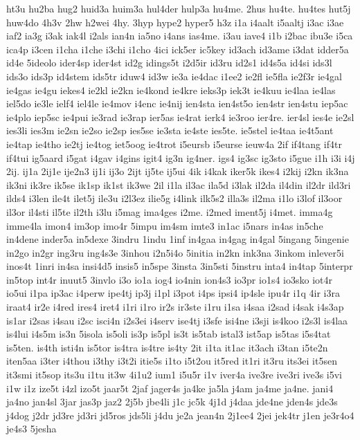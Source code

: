 {ht3u
hu2ba
hug2
huid3a
huim3a
hul4der
hulp3a
hu4me.
2hus
hu4te.
hu4tes
hut5j
huw4do
4h3v
2hw
h2wei
4hy.
3hyp
hype2
hyper5
h3z
i1a
i4aalt
i5aaltj
i3ac
i3ae
iaf2
ia3g
i3ak
iak4l
i2als
ian4n
ia5no
i4ans
ias4me.
i3au
iave4
i1b
i2bac
ibu3e
i5ca
ica4p
i3cen
i1cha
i1che
i3chi
i1cho
4ici
ick5er
ic5key
id3ach
id3ame
i3dat
idder5a
id4e
5ideolo
ider4sp
ider4st
id2g
idings5t
i2d5ir
id3ru
id2s1
id4s5a
id4si
ids3l
ids3o
ids3p
id4stem
ids5tr
iduw4
id3w
ie3a
ie4dac
i1ee2
ie2fl
ie5fla
ie2f3r
ie4gal
ie4gas
ie4gu
iekes4
ie2kl
ie2kn
ie4kond
ie4kre
ieks3p
iek3t
ie4kuu
ie4laa
ie4las
iel5do
ie3le
ielf4
iel4le
ie4mov
i4enc
ie4nij
ien4sta
ien4st5o
ien4str
ien4stu
iep5ac
ie4plo
iep5sc
ie4pui
ie3rad
ie3rap
ier5as
ie4rat
ierk4
ie3roo
ier4re.
ier4sl
ies4e
ie2sl
ies3li
ies3m
ie2sn
ie2so
ie2sp
ies5se
ie3sta
ie4ste
ies5te.
ie5stel
ie4taa
ie4t5ant
ie4tap
ie4tho
ie2tj
ie4tog
iet5oog
ie4trot
i5eursb
i5eurse
ieuw4a
2if
if4tang
if4tr
if4tui
ig5aard
i5gat
i4gav
i4gins
igit4
ig3n
ig4ner.
igs4
ig3sc
ig3sto
i5gue
i1h
i3i
i4j
2ij.
ij1a
2ij1e
ije2n3
ij1i
ij3o
2ijt
ij5te
ij5ui
4ik
i4kak
iker5k
ikes4
i2kij
i2kn
ik3na
ik3ni
ik3re
ik5se
ik1sp
ik1st
ik3we
2il
i1la
il3ac
ila5d
i3lak
il2da
il4din
il2dr
ild3ri
ilds4
i3len
ile4t
ilet5j
ile3u
i2l3ez
ilie5g
i4link
ilk5s2
illa3s
il2ma
i1lo
i3lof
il3oor
il3or
il4sti
il5te
il2th
i3lu
i5mag
ima4ges
i2me.
i2med
iment5j
i4met.
imma4g
imme4la
imon4
im3op
imo4r
5impu
im4sm
imte3
in1ac
i5nars
in4as
in5che
in4dene
inder5a
in5dexe
3indru
1indu
1inf
in4gaa
in4gag
in4gal
5ingang
5ingenie
in2go
in2gr
ing3ru
ing4s3e
3inhou
i2n5i4o
5initia
in2kn
ink3na
3inkom
inlever5i
inos4t
1inri
in4sa
insi4d5
insis5
in5spe
3insta
3in5sti
5instru
inta4
in4tap
5interpr
in5top
int4r
inuut5
3invlo
i3o
io1a
iog4
io4nin
ion4s3
io3pr
io1s4
io3sko
iot4r
io5ui
i1pa
ip3ac
i4perw
ipe4tj
ip3j
i1pl
i3pot
i4ps
ipsi4
ip4sle
ipu4r
i1q
4ir
i3ra
iraat4
ir2e
i4red
ires4
iret4
i1ri
i1ro
ir2s
ir3ste
i1ru
i1sa
i4saa
i2sad
i4sak
i4s3ap
is1ar
i2sas
i4sau
i2sc
isci4n
i2s3ei
i4serv
ise4tj
i3sfe
isi4ne
i3sji
is4koo
i2s3l
is4laa
is4lui
i4s5m
is3n
5isola
is5oli
is3p
is5pl
is3t
is5tab
istal3
ist5ap
is5tas
i5s4tat
is5ten.
is4th
isti4n
is5tor
is4tra
is4tre
is4ty
2it
i1ta
it1ac
it3ach
i3tan
i5te2n
iten5aa
i3ter
i4thou
i3thy
i3t2i
itie5s
i1to
i5t2ou
it5red
it1ri
it3ru
its3ei
it5sen
it3smi
it5sop
its3u
i1tu
it3w
4i1u2
ium1
i5u5r
i1v
iver4a
ive3re
ive3ri
ive3s
i5vi
i1w
i1z
ize5t
i4zl
izo5t
jaar5t
2jaf
jager4s
ja4ke
ja5la
j4am
ja4me
ja4ne.
jani4
ja4no
jan4sl
3jar
jas3p
jaz2
2j5b
jbe4li
j1c
jc5k
4j1d
j4daa
jde4ne
jden4s
jde3s
j4dog
j2dr
jd3re
jd3ri
jd5ros
jds5li
j4du
je2a
jean4n
2j1ee4
2jei
jek4tr
j1en
je3r4o4
je4s3
5jesha
}
